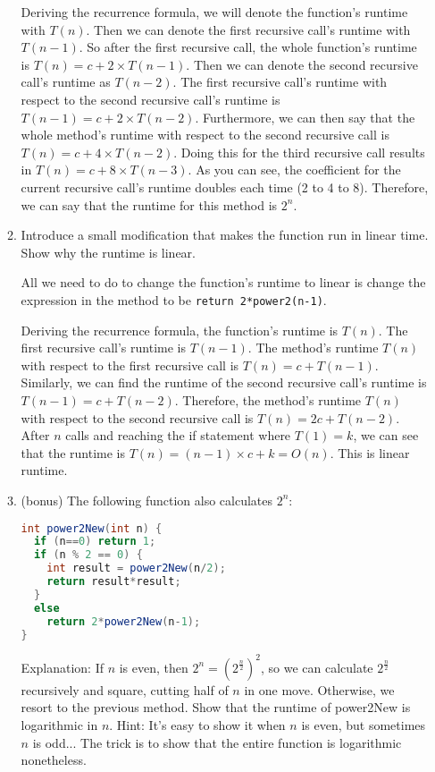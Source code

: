 \documentclass[letterpaper, 11pt]{article}
\begin{document}
\begin{enumerate}[leftmargin=*]
\begin{enumerate}
    Deriving the recurrence formula, we will denote the function's runtime with $T(n)$. Then we can denote the first recursive call's runtime with $T(n-1)$. So after the first recursive call, the whole function's runtime is $T(n)=c + 2 \times T(n-1)$. Then we can denote the second recursive call's runtime as $T(n-2)$. The first recursive call's runtime with respect to the second recursive call's runtime is $T(n-1) = c + 2 \times T(n-2)$. Furthermore, we can then say that the whole method's runtime with respect to the second recursive call is $T(n)= c + 4 \times T(n-2)$. Doing this for the third recursive call results in $T(n) = c + 8 \times T(n-3)$. As you can see, the coefficient for the current recursive call's runtime doubles each time (2 to 4 to 8). Therefore, we can say that the runtime for this method is $2^n$.
    
    \item Introduce a small modification that makes the function run in linear time. Show why the runtime is linear.
    
    All we need to do to change the function's runtime to linear is change the expression in the method to be \texttt{return 2*power2(n-1)}.

    Deriving the recurrence formula, the function's runtime is $T(n)$. The first recursive call's runtime is $T(n-1)$. The method's runtime $T(n)$ with respect to the first recursive call is $T(n) = c + T(n-1)$. Similarly, we can find the runtime of the second recursive call's runtime is $T(n-1) = c + T(n-2)$. Therefore, the method's runtime $T(n)$ with respect to the second recursive call is $T(n) = 2c + T(n-2)$. After $n$ calls and reaching the if statement where $T(1) = k$, we can see that the runtime is $T(n) = (n-1) \times c + k = O(n)$. This is linear runtime.
    
    \item (bonus) The following function also calculates $2^n$:

\begin{tcolorbox}
\begin{lstlisting}[language=Java]
int power2New(int n) {
  if (n==0) return 1;
  if (n % 2 == 0) {
    int result = power2New(n/2);
    return result*result;
  }
  else
    return 2*power2New(n-1);
}
\end{lstlisting}
\end{tcolorbox}

Explanation: If $n$ is even, then $2^n = (2^{\frac{n}{2}})^2$, so we can calculate $2^{\frac{n}{2}}$ recursively and square, cutting half of $n$ in one move. Otherwise, we resort to the previous method. Show that the runtime of power2New is logarithmic in $n$. Hint: It's easy to show it when $n$ is even, but sometimes $n$ is odd... The trick is to show that the entire function is logarithmic nonetheless.
\end{enumerate}


\end{enumerate}
\end{document}
